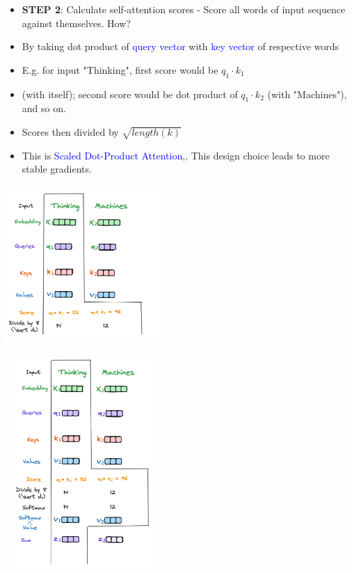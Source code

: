 \documentclass{article}
\begin{document}
\begin{minipage}{0.5\textwidth}

\begin{itemize}
    \item \textbf{STEP 2}: Calculate self-attention scores - Score all words of input sequence against themselves. How?
    \item By taking dot product of \textcolor{blue}{query vector} with \textcolor{blue}{key vector} of respective words
    \item E.g. for input "Thinking", first score would be $q_1 \cdot k_1 $
    \item  (with itself); second score would be dot product of $q_1 \cdot k_2$ (with "Machines"), and so on.
    \item Scores then divided by $\sqrt{length(k)}$
    \item This is \textcolor{blue}{Scaled Dot-Product Attention},. This design choice leads to more stable gradients.
\end{itemize}
\end{minipage}
\begin{minipage}{0.5\textwidth}
\includegraphics[width=6cm, height=6cm]{Transformer/Images/SelfAttention2.png}
\end{minipage}
\begin{minipage}{0.5\textwidth}
\includegraphics[width=6cm, height=8cm]{Transformer/Images/SelfAttention3.png}
\end{minipage}
\end{document}
